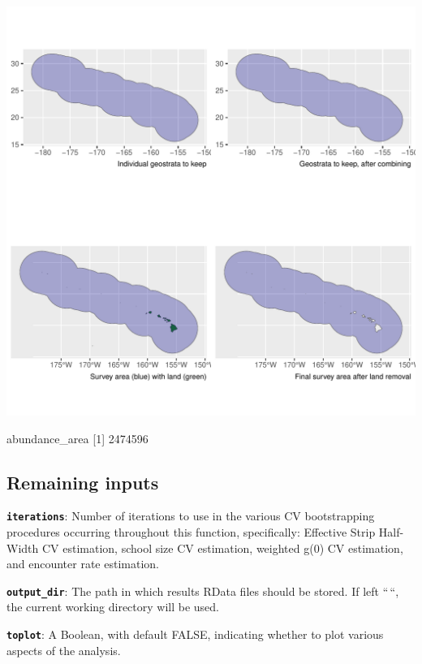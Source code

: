 \documentclass[
]{book}
\newenvironment{Shaded}{\begin{snugshade}}{\end{snugshade}}
\newcommand{\DecValTok}[1]{\textcolor[rgb]{0.00,0.00,0.81}{#1}}
\newcommand{\NormalTok}[1]{#1}
\begin{document}
\includegraphics{figures/unnamed-chunk-299-1.pdf}

\begin{Shaded}
\begin{Highlighting}[]

\NormalTok{abundance\_area}
\NormalTok{[}\DecValTok{1}\NormalTok{] }\DecValTok{2474596}
\end{Highlighting}
\end{Shaded}

\hypertarget{remaining-inputs}{%
\subsection*{Remaining inputs}\label{remaining-inputs}}

\textbf{\texttt{iterations}}: Number of iterations to use in the various CV bootstrapping procedures occurring throughout this function, specifically: Effective Strip Half-Width CV estimation, school size CV estimation, weighted g(0) CV estimation, and encounter rate estimation.

\textbf{\texttt{output\_dir}}: The path in which results RData files should be stored. If left ``\,``, the current working directory will be used.

\textbf{\texttt{toplot}}: A Boolean, with default FALSE, indicating whether to plot various aspects of the analysis.
\end{document}
